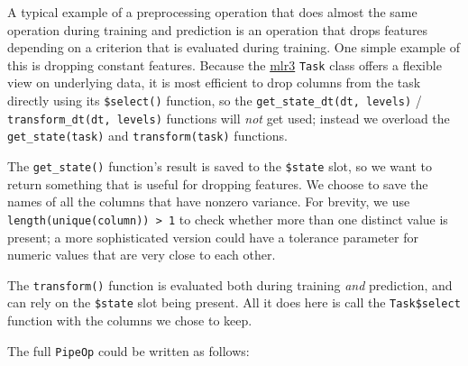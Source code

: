 \documentclass[
  11pt,
  parskip=half,
  DIV=calc,
  BCOR=10mm,
  x11names]{scrbook}
\begin{document}
A typical example of a preprocessing operation that does almost the same operation during training and prediction is an operation that drops features depending on a criterion that is evaluated during training.
One simple example of this is dropping constant features.
Because the \href{https://mlr3.mlr-org.com}{mlr3} \texttt{Task} class offers a flexible view on underlying data, it is most efficient to drop columns from the task directly using its \texttt{\$select()} function, so the \texttt{get\_state\_dt(dt,\ levels)} / \texttt{transform\_dt(dt,\ levels)} functions will \emph{not} get used; instead we overload the \texttt{get\_state(task)} and \texttt{transform(task)} functions.

The \texttt{get\_state()} function's result is saved to the \texttt{\$state} slot, so we want to return something that is useful for dropping features.
We choose to save the names of all the columns that have nonzero variance.
For brevity, we use \texttt{length(unique(column))\ \textgreater{}\ 1} to check whether more than one distinct value is present; a more sophisticated version could have a tolerance parameter for numeric values that are very close to each other.

The \texttt{transform()} function is evaluated both during training \emph{and} prediction, and can rely on the \texttt{\$state} slot being present.
All it does here is call the \texttt{Task\$select} function with the columns we chose to keep.

The full \texttt{PipeOp} could be written as follows:
\end{document}
